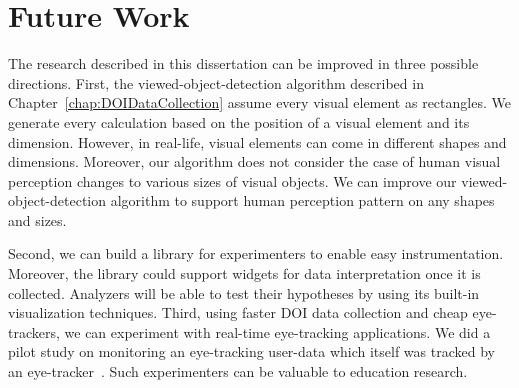 \section{Future Work}
The research described in this dissertation can be improved in three possible directions. First, the viewed-object-detection algorithm described in Chapter~\ref{chap:DOIDataCollection} assume every visual element as rectangles. We generate every calculation based on the position of a visual element and its dimension. However, in real-life, visual elements can come in different shapes and dimensions. Moreover, our algorithm does not consider the case of human visual perception changes to various sizes of visual objects. We can improve our viewed-object-detection algorithm to support human perception pattern on any shapes and sizes. 

Second, we can build a library for experimenters to enable easy instrumentation. Moreover, the library could support widgets for data interpretation once it is collected. Analyzers will be able to test their hypotheses by using its built-in visualization techniques. Third, using faster DOI data collection and cheap eye-trackers, we can experiment with real-time eye-tracking applications. We did a pilot study on monitoring an eye-tracking user-data which itself was tracked by an eye-tracker~\cite{alam2015they}. Such experimenters can be valuable to education research. 
